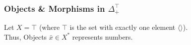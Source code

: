 \documentclass[aspectratio=169]{beamer}
\theoremstyle{remarkstyle}
\begin{document}
\begin{frame}[fragile]
  \frametitle{Objects \& Morphisms in $Δ_+^⊤$}
  \begin{example}
    Let $X = ⊤$ (where $⊤$ is the set with exactly one element $⟨⟩$).\\Thus, Objects $\bar{x} ∈ X^*$ represents numbers. 
    \begin{columns}
      \begin{column}{0.6\textwidth}
        \begin{center}
        \end{center}
      \end{column}
      \begin{column}{0.4\textwidth}
        \begin{center}
        \end{center}
      \end{column}
    \end{columns}
  \end{example}
\end{frame}
\end{document}
